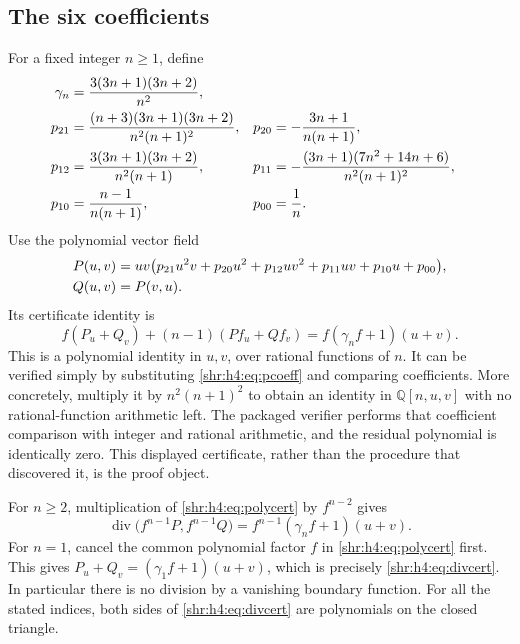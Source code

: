 \documentclass[11pt,letterpaper]{article}
\numberwithin{equation}{section}
\theoremstyle{definition}
\newcommand{\Q}{\mathbb Q}
\newcommand{\1}{\mathbf 1}
\DeclareMathOperator{\diver}{div}
\begin{document}
\subsection{The six coefficients}
For a fixed integer $n\ge1$, define
\begin{align}
 \gamma_n&=\frac{3(3n+1)(3n+2)}{n^2},\notag\\
 p_{21}&=\frac{(n+3)(3n+1)(3n+2)}{n^2(n+1)^2},&
 p_{20}&=-\frac{3n+1}{n(n+1)},\notag\\
 p_{12}&=\frac{3(3n+1)(3n+2)}{n^2(n+1)},&
 p_{11}&=-\frac{(3n+1)(7n^2+14n+6)}{n^2(n+1)^2},\label{shr:h4:eq:pcoeff}\\
 p_{10}&=\frac{n-1}{n(n+1)},&p_{00}&=\frac1n.\notag
\end{align}
Use the polynomial vector field
\begin{align}
 P(u,v)&=uv\bigl(p_{21}u^2v+p_{20}u^2+p_{12}uv^2
                      +p_{11}uv+p_{10}u+p_{00}\bigr),\notag\\
 Q(u,v)&=P(v,u).
 \label{shr:h4:eq:PQ}
\end{align}
Its certificate identity is
\begin{equation}
 f(P_u+Q_v)+(n-1)(Pf_u+Qf_v)
       =f(\gamma_n f+1)(u+v).
 \label{shr:h4:eq:polycert}
\end{equation}
This is a polynomial identity in $u,v$, over rational functions of $n$.
It can be verified simply by substituting \eqref{shr:h4:eq:pcoeff} and comparing
coefficients. More concretely, multiply it by $n^2(n+1)^2$ to obtain an
identity in $\Q[n,u,v]$ with no rational-function arithmetic left. The
packaged verifier performs that coefficient comparison with integer and
rational arithmetic, and the residual polynomial is identically zero.
This displayed certificate, rather than the procedure that discovered it,
is the proof object.

For $n\ge2$, multiplication of \eqref{shr:h4:eq:polycert} by $f^{n-2}$ gives
\begin{equation}
 \diver\bigl(f^{n-1}P,f^{n-1}Q\bigr)
   =f^{n-1}(\gamma_n f+1)(u+v).
 \label{shr:h4:eq:divcert}
\end{equation}
For $n=1$, cancel the common polynomial factor $f$ in
\eqref{shr:h4:eq:polycert} first. This gives $P_u+Q_v=(\gamma_1f+1)(u+v)$,
which is precisely \eqref{shr:h4:eq:divcert}. In particular there is no division
by a vanishing boundary function. For all the stated indices, both sides
of \eqref{shr:h4:eq:divcert} are polynomials on the closed triangle.
\end{document}
